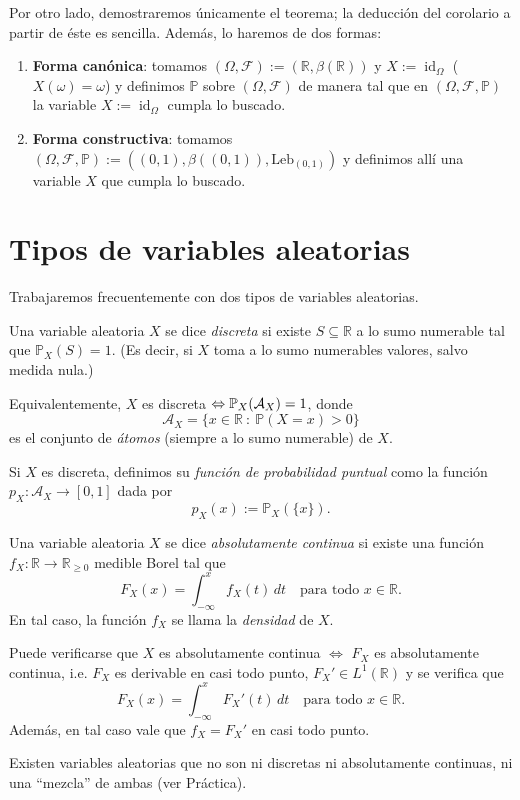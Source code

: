 Por otro lado, demostraremos únicamente el teorema; la deducción del corolario a partir de éste es sencilla. Además, lo haremos de dos formas:
\begin{enumerate}
    \item \textbf{Forma canónica}: tomamos \((\Omega, \mathcal{F}) := (\mathbb{R}, \beta(\mathbb{R}))\) y \(X := \operatorname{id}_\Omega\) (\(X(\omega) = \omega\)) y definimos \(\mathbb{P}\) sobre \((\Omega, \mathcal{F})\) de manera tal que en \((\Omega, \mathcal{F}, \mathbb{P})\) la variable \(X := \operatorname{id}_\Omega\) cumpla lo buscado.

	\item \textbf{Forma constructiva}: tomamos \((\Omega, \mathcal{F}, \mathbb{P}) := ((0,1), \beta((0,1)), \text{Leb}_{(0,1)})\) y definimos allí una variable \(X\) que cumpla lo buscado.
\end{enumerate}

\section{Tipos de variables aleatorias}

Trabajaremos frecuentemente con dos tipos de variables aleatorias.

\begin{definition}
	Una variable aleatoria \(X\) se dice \textit{discreta} si existe \(S \subseteq \mathbb{R}\) a lo sumo numerable tal que \(\mathbb{P}_X(S) = 1\). (Es decir, si $X$ toma a lo sumo numerables valores, salvo medida nula.)
\end{definition}

Equivalentemente, \(X\) es discreta $\Leftrightarrow \mathbb{P}_{X}(\mathcal{A}_{X}) = 1$, donde
\[
\mathcal{A}_{X} = \{x \in \mathbb{R} \ : \ \mathbb{P}(X = x) > 0\}
\]
es el conjunto de \textit{átomos} (siempre a lo sumo numerable) de \(X\).

Si \(X\) es discreta, definimos su \textit{función de probabilidad puntual} como la función \(p_{X} : \mathcal{A}_{X} \to [0,1]\) dada por
\[
p_X(x) := \mathbb{P}_{X}(\{x\}). 
\]

\begin{definition}
    Una variable aleatoria \(X\) se dice \textit{absolutamente continua} si existe una función \(f_{X}: \mathbb{R} \to \mathbb{R}_{\ge 0}\) medible Borel tal que
    \[
    F_X(x) = \int_{-\infty}^{x} f_{X}(t)\,dt \quad \text{para todo } x \in \mathbb{R}.
    \]
    En tal caso, la función \(f_{X}\) se llama la \textit{densidad} de \(X\).
\end{definition}

Puede verificarse que \(X\) es absolutamente continua \(\iff\) \(F_X\) es absolutamente continua, i.e. \(F_X\) es derivable en casi todo punto, \(F_X' \in L^1(\mathbb{R})\) y se verifica que
\[
F_X(x) = \int_{-\infty}^{x} F_{X}'(t)\,dt \quad \text{para todo } x \in \mathbb{R}.
\]
Además, en tal caso vale que \(f_X = F_X'\) en casi todo punto.

\begin{remark}
    Existen variables aleatorias que no son ni discretas ni absolutamente continuas, ni una ``mezcla'' de ambas (ver Práctica).
\end{remark}

